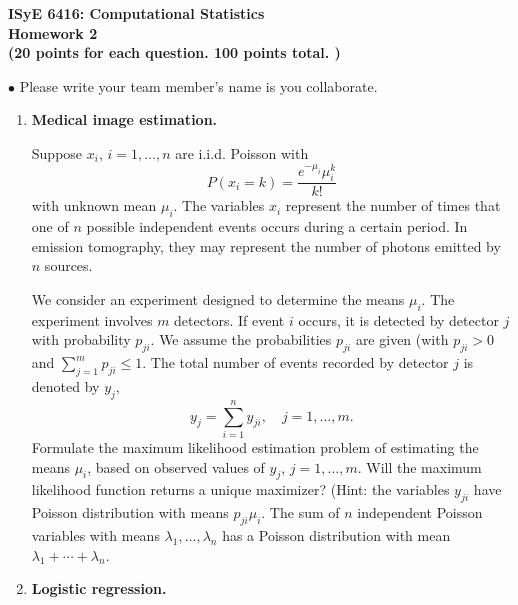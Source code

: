 \documentclass[11pt]{article}
\begin{document}
\begin{center}
{\bf ISyE 6416: Computational Statistics}\\
{\bf Homework 2 \\ (20 points for each question. 100 points total. )}
\end{center}


\vspace{.05in} \noindent $\bullet$ Please write your team member's name is you collaborate.

\vspace{.20in}

\begin{enumerate}



\item {\bf Medical image estimation.}

Suppose $x_i$, $i = 1, \ldots, n$ are i.i.d. Poisson with 
\[
P(x_i = k) = \frac{e^{-\mu_i} \mu_i^k}{k!}
\]
with unknown mean $\mu_i$. The variables $x_i$ represent the number of times that one of $n$ possible independent events occurs during a certain period. In emission tomography, they may represent the number of photons emitted by $n$ sources. 

We consider an experiment designed to determine the means $\mu_i$. The experiment involves $m$ detectors. If event $i$ occurs, it is detected by detector $j$ with probability $p_{ji}$. We assume the probabilities $p_{ji}$ are given (with $p_{ji} > 0$ and $\sum_{j=1}^m p_{ji}\leq 1$. The total number of events recorded by detector $j$ is denoted by $y_j$,
\[
y_j = \sum_{i=1}^n y_{ji}, \quad j = 1, \ldots, m.
\]
Formulate the maximum likelihood estimation problem of estimating the means $\mu_i$, based on observed values of $y_j$, $j = 1, \ldots, m$. Will the maximum likelihood function returns a unique maximizer?
(Hint: the variables $y_{ji}$ have Poisson distribution with means $p_{ji} \mu_i$. The sum of $n$ independent Poisson variables with means $\lambda_1, \ldots, \lambda_n$ has a Poisson distribution with mean $\lambda_1 + \cdots + \lambda_n$.



\item {\bf Logistic regression.} 


\end{enumerate}
\end{document}
